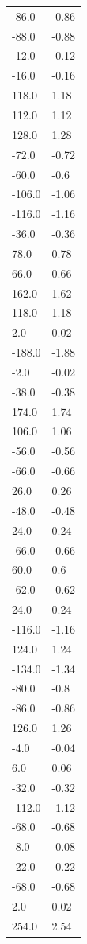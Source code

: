 \begin{longtable}{ll}
-86.0 & -0.86 \\
-88.0 & -0.88 \\
-12.0 & -0.12 \\
-16.0 & -0.16 \\
118.0 & 1.18 \\
112.0 & 1.12 \\
128.0 & 1.28 \\
-72.0 & -0.72 \\
-60.0 & -0.6 \\
-106.0 & -1.06 \\
-116.0 & -1.16 \\
-36.0 & -0.36 \\
78.0 & 0.78 \\
66.0 & 0.66 \\
162.0 & 1.62 \\
118.0 & 1.18 \\
2.0 & 0.02 \\
-188.0 & -1.88 \\
-2.0 & -0.02 \\
-38.0 & -0.38 \\
174.0 & 1.74 \\
106.0 & 1.06 \\
-56.0 & -0.56 \\
-66.0 & -0.66 \\
26.0 & 0.26 \\
-48.0 & -0.48 \\
24.0 & 0.24 \\
-66.0 & -0.66 \\
60.0 & 0.6 \\
-62.0 & -0.62 \\
24.0 & 0.24 \\
-116.0 & -1.16 \\
124.0 & 1.24 \\
-134.0 & -1.34 \\
-80.0 & -0.8 \\
-86.0 & -0.86 \\
126.0 & 1.26 \\
-4.0 & -0.04 \\
6.0 & 0.06 \\
-32.0 & -0.32 \\
-112.0 & -1.12 \\
-68.0 & -0.68 \\
-8.0 & -0.08 \\
-22.0 & -0.22 \\
-68.0 & -0.68 \\
2.0 & 0.02 \\
254.0 & 2.54 \\

\end{longtable}
